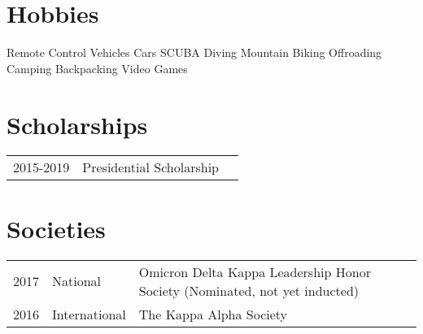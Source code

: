 \documentclass[]{deedy-resume-openfont}
\begin{document}

\section{Hobbies} 
Remote Control Vehicles \textbullet{} Cars \textbullet{} SCUBA Diving \textbullet{} Mountain Biking \textbullet{} Offroading \textbullet{} Camping \textbullet{} Backpacking \textbullet{} Video Games
\sectionsep{}



\section{Scholarships} 
\begin{tabular}{rll}
2015-2019	     & Presidential Scholarship\\
\end{tabular}
\sectionsep


\section{Societies} 

\begin{tabular}{rll}
2017   & National		& Omicron Delta Kappa Leadership Honor Society (Nominated, not yet inducted)\\
2016   & International   & The Kappa Alpha Society\\
\end{tabular}
\sectionsep

\end{document}
